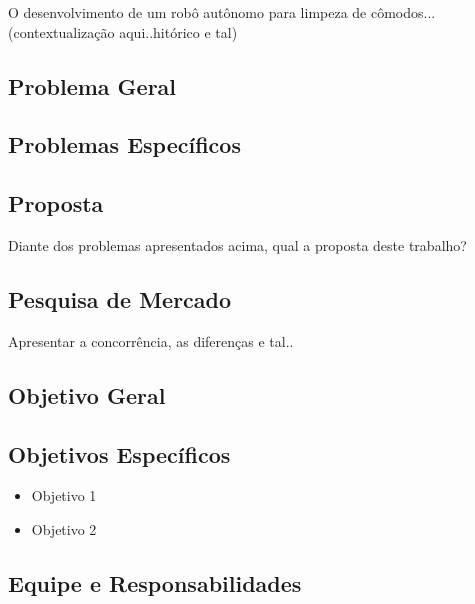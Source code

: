 O desenvolvimento de um robô autônomo para limpeza de cômodos... (contextualização aqui..hitórico e tal)

\subsection{Problema Geral} %
\label{sub:problemaGeral}


\subsection{Problemas Específicos} %
\label{sub:problemas_específicos}


\subsection{Proposta} %
\label{sub:proposta}
	Diante dos problemas apresentados acima, qual a proposta deste trabalho?

\subsection{Pesquisa de Mercado} %
\label{sub:pesquisa_de_mercado}
Apresentar a concorrência, as diferenças e tal..

\subsection{Objetivo Geral} %
\label{sub:objetivo_geral}


\subsection{Objetivos Específicos} %
\label{sub:objetivos_específicos}
	
	\begin{itemize}
		\item Objetivo 1
		\item Objetivo 2
	\end{itemize}

\subsection{Equipe e Responsabilidades} %
\label{sub:equipe_e_responsabilidades}

